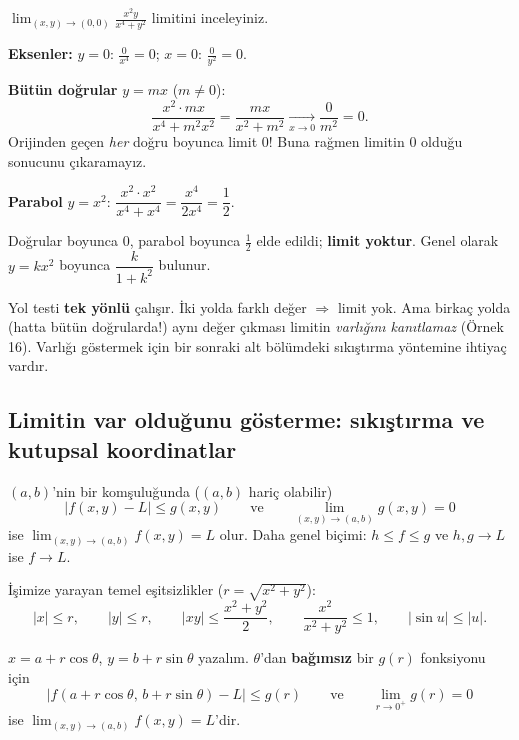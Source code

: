 \begin{soru}
$\displaystyle\lim_{(x,y)\to(0,0)}\frac{x^2y}{x^4+y^2}$ limitini inceleyiniz.
\end{soru}
\begin{cevap}
\textbf{Eksenler:} $y=0$: $\frac{0}{x^4}=0$; $x=0$: $\frac0{y^2}=0$.

\textbf{Bütün doğrular} $y=mx$ ($m\neq0$):
\[
\frac{x^2\cdot mx}{x^4+m^2x^2}=\frac{mx}{x^2+m^2}\xrightarrow[x\to0]{}\frac{0}{m^2}=0 .
\]
Orijinden geçen \emph{her} doğru boyunca limit $0$! Buna rağmen limitin $0$ olduğu sonucunu çıkaramayız.

\textbf{Parabol} $y=x^2$: $\dfrac{x^2\cdot x^2}{x^4+x^4}=\dfrac{x^4}{2x^4}=\dfrac12$.

Doğrular boyunca $0$, parabol boyunca $\frac12$ elde edildi; \textbf{limit yoktur}. Genel olarak $y=kx^2$ boyunca
$\dfrac{k}{1+k^2}$ bulunur.
\end{cevap}

\begin{dikkat}
Yol testi \textbf{tek yönlü} çalışır. İki yolda farklı değer $\Rightarrow$ limit yok. Ama birkaç yolda (hatta bütün
doğrularda!) aynı değer çıkması limitin \emph{varlığını kanıtlamaz} (Örnek 16). Varlığı göstermek için bir sonraki
alt bölümdeki sıkıştırma yöntemine ihtiyaç vardır.
\end{dikkat}

\subsection{Limitin var olduğunu gösterme: sıkıştırma ve kutupsal koordinatlar}

\begin{teorem}
$(a,b)$'nin bir komşuluğunda ($(a,b)$ hariç olabilir)
\[
|f(x,y)-L|\le g(x,y)\qquad\text{ve}\qquad \lim_{(x,y)\to(a,b)}g(x,y)=0
\]
ise $\displaystyle\lim_{(x,y)\to(a,b)}f(x,y)=L$ olur. Daha genel biçimi: $h\le f\le g$ ve $h,g\to L$ ise $f\to L$.
\end{teorem}

İşimize yarayan temel eşitsizlikler ($r=\sqrt{x^2+y^2}$):
\[
|x|\le r,\qquad |y|\le r,\qquad |xy|\le\frac{x^2+y^2}{2},\qquad \frac{x^2}{x^2+y^2}\le1,\qquad |\sin u|\le|u| .
\]

\begin{teorem}
$x=a+r\cos\theta$, $y=b+r\sin\theta$ yazalım. $\theta$'dan \textbf{bağımsız} bir $g(r)$ fonksiyonu için
\[
|f(a+r\cos\theta,\,b+r\sin\theta)-L|\le g(r)\qquad\text{ve}\qquad\lim_{r\to0^+}g(r)=0
\]
ise $\displaystyle\lim_{(x,y)\to(a,b)}f(x,y)=L$'dir.
\end{teorem}

